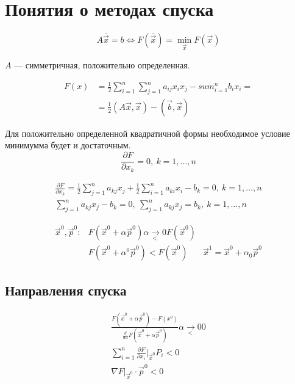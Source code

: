 \section{Понятия о методах спуска}

\[  
  A \overline{\vec{x}} = b \iff F(\overline{\vec{x}}) = \min_{\vec{x}}
  F(\vec{x})
\]

$A$ --- симметричная, положительно определенная.

\begin{align*}
  F(x) &= \frac 12 \sum_{i = 1}^n \sum_{j = 1}^n a_{ij} x_i x_j - sum_{i = 1}^n b_i x_i =\\ 
       &= \frac 12 (A\vec{x}, \vec{x}) - (\vec{b}, \vec{x})
\end{align*}

Для положительно определенной квадратичной формы необходимое условие минимумма
будет и достаточным.
\[
  \frac{\partial F}{\partial x_k} = 0,\ k = 1, \dotsc, n
\]

\begin{gather*}
  \frac{\partial F}{\partial x_k} = \frac 12 \sum_{j = 1}^n a_{kj}x_j + \frac 12
  \sum_{i = 1}^n a_{ki}x_i - b_k = 0,\ k = 1,\dotsc, n \\
  \sum_{j = 1}^n a_{kj} x_j - b_k = 0,\ \sum_{j = 1}^n a_{kj}x_j = b_k,\ k = 1,
  \dotsc, n
\end{gather*}

\begin{align*}
  \vec{x}^0, \vec{p}^0: &F(\vec{x}^0 + \alpha \vec{p}^0) \underset{<}{\alpha \to
                          0} F(\vec{x}^0)\\
                        &F(\vec{x}^0 + \alpha^0 \vec{p}^0) < F(\vec{x}^0)
                        &\vec{x}^1 = \vec{x}^0 + \alpha_0 \vec{p}^0
\end{align*}

\subsection{Направления спуска}
\begin{gather*}
  \frac{F(\vec{x}^0 + \alpha \vec{p}^0) - F(x^0)}{\frac{d}{d\alpha} F(\vec{x}^0
    + \alpha \vec{p}^0)} \underset{<}{\alpha \to 0} 0 \\
  \sum_{i = 1}^n \frac{\partial F}{\partial x_i} |_{\vec{x}^0} P_i < 0\\
  \nabla F |_{\vec{x}^0} \cdot \vec{p}^0 < 0
\end{gather*}

